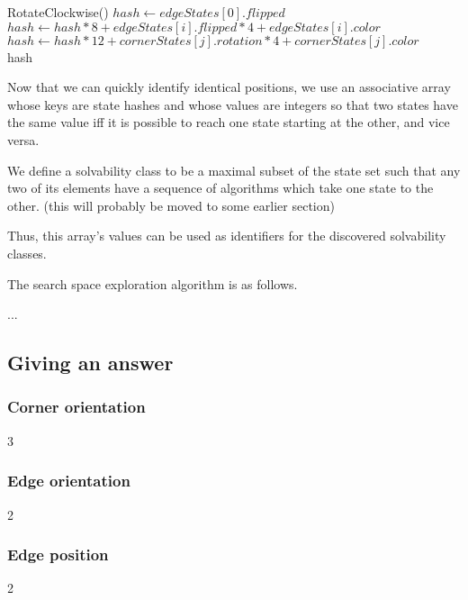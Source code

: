 \documentclass{article}
\begin{document}
            \begin{algorithmic}
            \Repeat
                \State RotateClockwise()
            \State $hash \gets edgeStates[0].flipped$
                \State $hash \gets hash * 8 + edgeStates[i].flipped * 4 + edgeStates[i].color$
            \EndFor
                \State $hash \gets hash * 12 + cornerStates[j].rotation * 4 + cornerStates[j].color$
            \EndFor \\
            \Return hash
            \end{algorithmic}

            Now that we can quickly identify identical positions, we use an
            associative array whose keys are state hashes and whose values are
            integers so that two states have the same value iff it is possible
            to reach one state starting at the other, and vice versa.

            We define a solvability class to be a maximal subset of the state
            set such that any two of its elements have a sequence of algorithms
            which take one state to the other. (this will probably be moved to
            some earlier section)

            Thus, this array's values can be used as identifiers for the
            discovered solvability classes.

            The search space exploration algorithm is as follows.

            ...

        
        \subsection{Giving an answer}
            \subsubsection{Corner orientation}
                3

            \subsubsection{Edge orientation}
                2

            \subsubsection{Edge position}
                2
\end{document}
